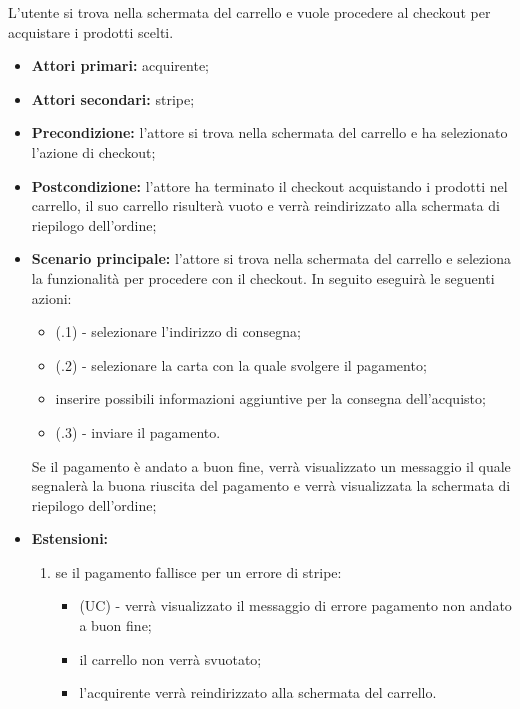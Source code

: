 L'utente si trova nella schermata del carrello e vuole procedere al checkout per acquistare i prodotti scelti.
\begin{itemize}
    \item \textbf{Attori primari:} acquirente;
    \item \textbf{Attori secondari:} stripe;
    \item \textbf{Precondizione:} l'attore si trova nella schermata del carrello e ha selezionato l'azione di checkout;
    \item \textbf{Postcondizione:} l'attore ha terminato il checkout acquistando i prodotti nel carrello, il suo carrello risulterà vuoto e verrà reindirizzato alla schermata di riepilogo dell'ordine;
    \item \textbf{Scenario principale:} l'attore si trova nella schermata del carrello e seleziona la funzionalità per procedere con il checkout. In seguito eseguirà le seguenti azioni:
    \begin{itemize}
    	\item (\actualUC.1) - selezionare l'indirizzo di consegna;
    	\item (\actualUC.2) - selezionare la carta con la quale svolgere il pagamento;
    	\item inserire possibili informazioni aggiuntive per la consegna dell'acquisto;
        \item (\actualUC.3) - inviare il pagamento.
    \end{itemize}
    Se il pagamento è andato a buon fine, verrà visualizzato un messaggio il quale segnalerà la buona riuscita del pagamento e verrà visualizzata la schermata di riepilogo dell'ordine;
    \item \textbf{Estensioni:}
    \begin{enumerate}[label=\lett]
        \item se il pagamento fallisce per un errore di stripe:
        \begin{itemize}
            \item (UC) - verrà visualizzato il messaggio di errore pagamento non andato a buon fine;
            \item il carrello non verrà svuotato;
            \item l'acquirente verrà reindirizzato alla schermata del carrello.
        \end{itemize}
    \end{enumerate}
\end{itemize}

\resetSubUC

